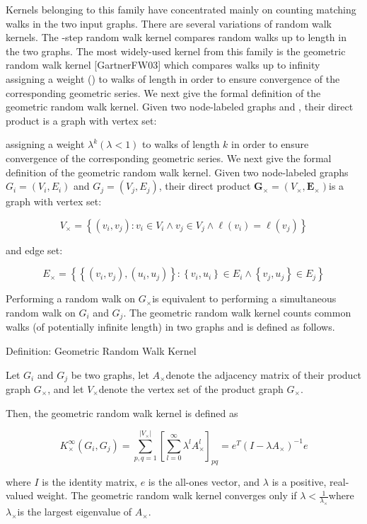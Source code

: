 Kernels belonging to this family have concentrated mainly on counting matching walks in the two input graphs. There are several variations of random walk kernels. The -step random walk kernel compares random walks up to length  in the two graphs. The most widely-used kernel from this family is the geometric random walk kernel [GartnerFW03] which compares walks up to infinity assigning a weight  () to walks of length  in order to ensure convergence of the corresponding geometric series. We next give the formal definition of the geometric random walk kernel. Given two node-labeled graphs  and  , their direct product is a graph with vertex set:

assigning a weight $\lambda^{k}(\lambda<1)$ to walks of length $k$ in order to ensure convergence of the corresponding geometric series. We next give the formal definition of the geometric random walk kernel. Given two node-labeled graphs $G_{i}=\left(V_{i}, E_{i}\right)$ and $G_{j}=\left(V_{j}, E_{j}\right)$, their direct product $\boldsymbol{G}_{\times}=\left(V_{\times}, \boldsymbol{E}_{\times}\right)$is a graph with vertex set:

$$
V_{\times}=\left\{\left(v_{i}, v_{j}\right): v_{i} \in V_{i} \wedge v_{j} \in V_{j} \wedge \ell\left(v_{i}\right)=\ell\left(v_{j}\right)\right\}
$$

and edge set:

$$
E_{\times}=\left\{\left\{\left(v_{i}, v_{j}\right),\left(u_{i}, u_{j}\right)\right\}:\left\{v_{i}, u_{i}\right\} \in E_{i} \wedge\left\{v_{j}, u_{j}\right\} \in E_{j}\right\}
$$

Performing a random walk on $G_{\times}$is equivalent to performing a simultaneous random walk on $G_{i}$ and $G_{j}$. The geometric random walk kernel counts common walks (of potentially infinite length) in two graphs and is defined as follows.

{Definition: Geometric Random Walk Kernel}

Let $G_{i}$ and $G_{j}$ be two graphs, let $A_{\times}$denote the adjacency matrix of their product graph $G_{\times}$, and let $V_{\times}$denote the vertex set of the product graph $G_{\times}$.

Then, the geometric random walk kernel is defined as

$$
K_{\times}^{\infty}\left(G_{i}, G_{j}\right)=\sum_{p, q=1}^{\left|V_{\times}\right|}\left[\sum_{l=0}^{\infty} \lambda^{l} A_{\times}^{l}\right]_{p q}=e^{T}\left(I-\lambda A_{\times}\right)^{-1} e
$$

where $I$ is the identity matrix, $e$ is the all-ones vector, and $\lambda$ is a positive, real-valued weight. The geometric random walk kernel converges only if $\lambda<\frac{1}{\lambda_{\times}}$where $\lambda_{\times}$is the largest eigenvalue of $A_{\times}$.

